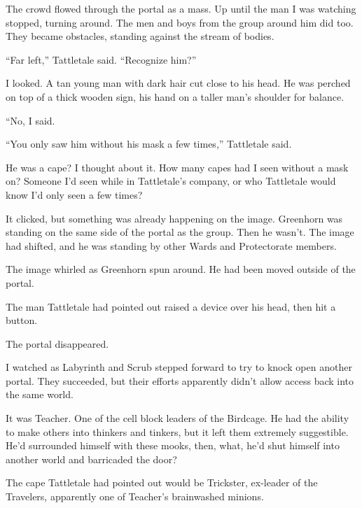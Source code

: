 The crowd flowed through the portal as a mass.  Up until the man I was watching stopped, turning around.  The men and boys from the group around him did too.  They became obstacles, standing against the stream of bodies.



``Far left,'' Tattletale said.  ``Recognize him?''



I looked.  A tan young man with dark hair cut close to his head.  He was perched on top of a thick wooden sign, his hand on a taller man's shoulder for balance.



``No, I said.



``You only saw him without his mask a few times,'' Tattletale said.



He was a cape?  I thought about it.  How many capes had I seen without a mask on?  Someone I'd seen while in Tattletale's company, or who Tattletale would know I'd only seen a few times?



It clicked, but something was already happening on the image.  Greenhorn was standing on the same side of the portal as the group.  Then he wasn't.  The image had shifted, and he was standing by other Wards and Protectorate members.



The image whirled as Greenhorn spun around.  He had been moved outside of the portal.



The man Tattletale had pointed out raised a device over his head, then hit a button.



The portal disappeared.



I watched as Labyrinth and Scrub stepped forward to try to knock open another portal.  They succeeded, but their efforts apparently didn't allow access back into the same world.



It was Teacher.  One of the cell block leaders of the Birdcage.  He had the ability to make others into thinkers and tinkers, but it left them extremely suggestible.  He'd surrounded himself with these mooks, then, what, he'd shut himself into another world and barricaded the door?



The cape Tattletale had pointed out would be Trickster, ex-leader of the Travelers, apparently one of Teacher's brainwashed minions.



